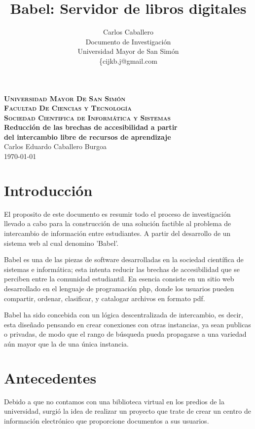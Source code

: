 \documentclass[letter,11pt,oneside,spanish]{article}
\title{\textbf{Babel: Servidor de libros digitales}}
\author{Carlos Caballero\\
        Documento de Investigaci\'on\\
        Universidad Mayor de San Sim\'on\\
	\{cijkb.j@gmail.com\\}
\date{}
\begin{document}
\begin{titlepage}
\thispagestyle{empty}
\begin{center}
\large{\textsc{\bf Universidad Mayor De San Simón}}\\
\large{\textsc{\bf Facultad De Ciencias y Tecnología}}\\
\large{\textsc{\bf Sociedad Cientifica de Informática y Sistemas}}\\
\vspace{4.0cm}
\large{\bf Reducción de las brechas de accesibilidad a partir\\
del intercambio libre de recursos de aprendizaje}\\
\vspace{1.0cm}
\small{Carlos Eduardo Caballero Burgoa}
~\\
\small{\today}
\end{center}
\end{titlepage}

\newpage
\tableofcontents

\newpage
\section{Introducción}
El proposito de este documento es resumir todo el proceso de investigación
llevado a cabo para la construcción de una solución factible al problema de
intercambio de información entre estudiantes. A partir del desarrollo de un
sistema web al cual denomino 'Babel'.

Babel es una de las piezas de software desarrolladas en la sociedad científica
de sistemas e informática; esta intenta reducir las brechas de accesibilidad que
se perciben entre la comunidad estudiantil. En esencia consiste en un sitio web
desarrollado en el lenguaje de programación php, donde los usuarios pueden
compartir, ordenar, clasificar, y catalogar archivos en formato pdf.

Babel ha sido concebida con un lógica descentralizada de intercambio, es
decir, esta diseñado pensando en crear conexiones con otras instancias, ya sean
publicas o privadas, de modo que el rango de búsqueda pueda propagarse a una
variedad aún mayor que la de una única instancia.

\section{Antecedentes}
Debido a que no contamos con una biblioteca virtual en los predios de la universidad, surgió la
idea de realizar un proyecto que trate de crear un centro de información electrónico que 
proporcione documentos a sus usuarios.
\end{document}
